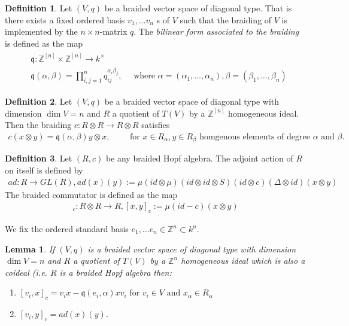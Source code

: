 \documentclass{amsart}
\newtheorem{lemma}{Lemma}
\theoremstyle{definition}
\newtheorem{definition}{Definition}
\begin{document}
	\begin{definition}
		Let $(V,q)$ be a braided vector space of diagonal type. That is there exists a fixed ordered basis
		$v_1,\dotsc v_n$ s of $V$ such that the braiding of $V$ is implemented by the $n \times n$-matrix $q$. The \emph{bilinear form associated to the braiding} is defined as the map 
		\begin{align}
		\begin{aligned}
		&\mathfrak{q}: \mathbb Z^{[n]} \times \mathbb Z^{[n]} \rightarrow k^\times \\
		&\mathfrak{q}(\alpha, \beta)= \prod_{i,j=1}^{n}q_{ij}^{\alpha_i\beta_j}, \quad \text{ where } \alpha= (\alpha_1,\dotsc,\alpha_n), \beta = (\beta_1, \dotsc,\beta_n)
		\end{aligned}
		\end{align} 	
	\end{definition}

	\begin{definition}
		Let $(V,q)$ be a braided vector space of diagonal type with dimension $\dim V =n$ and $R$ a quotient of $T(V)$ by a $\mathbb Z^{[n]}$ homogeneous ideal.
		Then the braiding $c: R\otimes R \rightarrow R \otimes R$ satisfies 
		\begin{align} 
			c(x\otimes y) = \mathfrak{q}(\alpha,\beta) y \otimes x,\qquad  \text{ for } x\in R_\alpha, y \in R_\beta \text{ homgenous elements of degree $\alpha$ and $\beta$}.
 		\end{align}	
	\end{definition}

	\begin{definition}
		Let $(R,c)$ be any braided Hopf algebra. The adjoint action of $R$ on itself is defined by
		\begin{align}
			ad: R\rightarrow GL(R),  ad(x)(y):= 	\mu(id \otimes \mu)(id \otimes id \otimes S)(id \otimes c)(\Delta \otimes id)(x \otimes y)
		\end{align}
		The braided commutator is defined as the map
		\begin{align}
			[-,-]_c: R \otimes R \rightarrow R, [x,y]_c := \mu (id-c)(x\otimes y)
		\end{align}
	\end{definition}

	We fix the ordered standard basis $e_1, \dotsc e_n \in\mathbb Z^n \subset k^n$.

	\begin{lemma}
		If $(V,q)$ is a braided vector space of diagonal type with dimension $\dim V =n$ and $R$ a quotient of $T(V)$ by a $\mathbb Z^{n}$ homogeneous ideal which is also a coideal (i.e. $R$ is a braided Hopf algebra then:
		\begin{enumerate}
			\item $[v_i,x]_c = v_ix - \mathfrak{q}(e_i,\alpha)x v_i \text{ for $v_i \in V$ and $x_\alpha \in R_\alpha$}$
			\item $[v_i,y]_c = ad(x)(y)$.
		\end{enumerate}
	\end{lemma}
\end{document}
